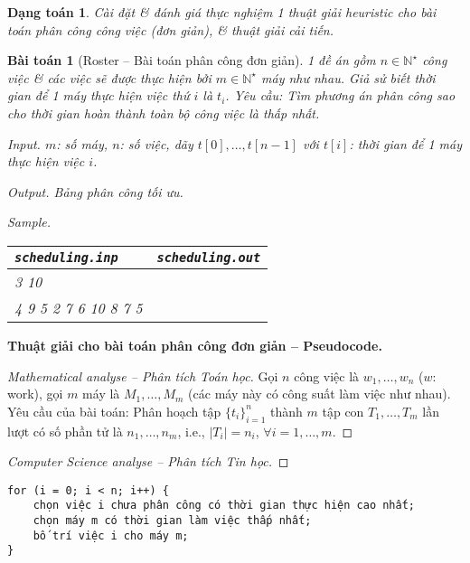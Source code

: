 \documentclass{article}
\newtheorem{baitoan}{Bài toán}
\newtheorem{dangtoan}{Dạng toán}
\begin{document}
\begin{dangtoan}
	Cài đặt \& đánh giá thực nghiệm 1 thuật giải heuristic cho bài toán phân công công việc (đơn giản), \& thuật giải cải tiến.
\end{dangtoan}

\begin{baitoan}[Roster -- Bài toán phân công đơn giản]
	1 đề án gồm $n\in\mathbb{N}^\star$ công việc \& các việc sẽ được thực hiện bởi $m\in\mathbb{N}^\star$ máy như nhau. Giả sử biết thời gian để 1 máy thực hiện việc thứ $i$  là $t_i$. Yêu cầu: Tìm phương án phân công sao cho thời gian hoàn thành toàn bộ công việc là thấp nhất.
	\item {\sf Input.} $m$: số máy, $n$: số việc, dãy $t[0],\ldots,t[n-1]$ với $t[i]$: thời gian để 1 máy thực hiện việc $i$.
	\item {\sf Output.} Bảng phân công tối ưu.
	\item {\sf Sample.}
	\begin{table}[H]
		\centering
		\begin{tabular}{|l|l|}
			\hline
			{\tt scheduling.inp} & {\tt scheduling.out} \\
			\hline
			3 10 &  \\
			4 9 5 2 7 6 10 8 7 5 &  \\
			\hline
		\end{tabular}
	\end{table}
\end{baitoan}
\noindent\textbf{\textsf{Thuật giải cho bài toán phân công đơn giản -- Pseudocode.}}
\begin{proof}[Mathematical analyse -- Phân tích Toán học]
	Gọi $n$ công việc là $w_1,\ldots,w_n$ ($w$: work), gọi $m$ máy là $M_1,\ldots,M_m$ (các máy này có công suất làm việc như nhau). Yêu cầu của bài toán: Phân hoạch tập $\{t_i\}_{i=1}^n$ thành $m$ tập con $T_1,\ldots,T_m$ lần lượt có số phần tử là $n_1,\ldots,n_m$, i.e., $|T_i| = n_i$, $\forall i = 1,\ldots,m$.
\end{proof}

\begin{proof}[Computer Science analyse -- Phân tích Tin học]
	
\end{proof}

\begin{verbatim}
for (i = 0; i < n; i++) {
    chọn việc i chưa phân công có thời gian thực hiện cao nhất;
    chọn máy m có thời gian làm việc thấp nhất;
    bố trí việc i cho máy m;
}
\end{verbatim}
\end{document}
